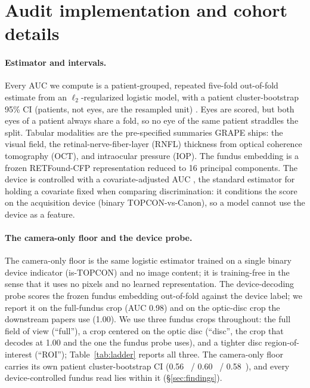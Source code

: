 
\section{Audit implementation and cohort details}
\label{app:setup}

\paragraph{Estimator and intervals.} Every AUC we compute is a patient-grouped, repeated five-fold out-of-fold
estimate from an $\ell_2$-regularized logistic model, with a patient cluster-bootstrap 95\% CI (patients, not eyes,
are the resampled unit) \citep{diciccio1996bootstrap}. Eyes are scored, but both eyes of a patient always share a
fold, so no eye of the same patient straddles the split. Tabular modalities are the pre-specified summaries GRAPE ships: the
visual field, the retinal-nerve-fiber-layer (RNFL) thickness from optical coherence tomography (OCT), and intraocular
pressure (IOP). The fundus embedding is a frozen RETFound-CFP \citep{zhou2023retfound}
representation reduced to 16 principal components. The device is controlled with a covariate-adjusted AUC
\citep{janes2009aroc}, the standard estimator for holding a covariate fixed when comparing discrimination: it conditions
the score on the acquisition device (binary TOPCON-vs-Canon), so a model cannot use the device as a feature.

\paragraph{The camera-only floor and the device probe.} The camera-only floor is the same logistic estimator trained
on a single binary device indicator (is-TOPCON) and no image content; it is training-free in the sense that it uses no
pixels and no learned representation. The device-decoding probe scores the frozen fundus embedding out-of-fold against
the device label; we report it on the full-fundus crop (AUC \num{0.98}) and on the optic-disc crop the downstream
papers use (\num{1.00}). We use three fundus crops throughout: the full field of view (``full''), a crop centered on the
optic disc (``disc'', the crop that decodes at \num{1.00} and the one the fundus probe uses), and a tighter disc
region-of-interest (``ROI''); Table~\ref{tab:ladder} reports all three. The camera-only floor carries its own patient cluster-bootstrap CI
(\num{0.56}~ / \num{0.60}~ / \num{0.58}~), and every device-controlled
fundus read lies within it (\S\ref{sec:findings}).

